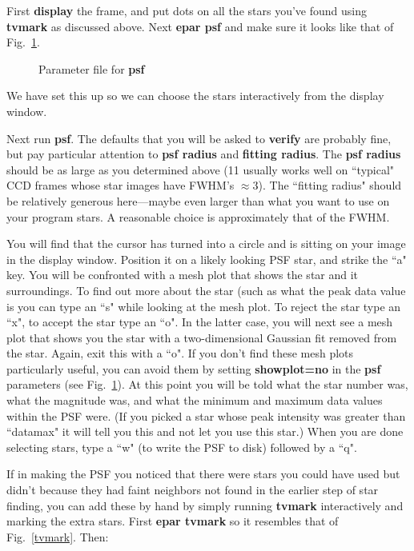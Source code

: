 First {\bf display} the frame, and put dots on all the stars you've found
using {\bf tvmark} as discussed above.  Next {\bf epar psf} and make sure
it looks like that of Fig.~\ref{psfparams}.
\begin{figure}
\vspace{2.5in}
\caption{\label{psfparams} Parameter file for {\bf psf}}
\end{figure}
We have set this up so we can choose the stars interactively from the
display window.
 
Next run {\bf psf}.  The defaults that you will be asked to {\bf verify}
are probably fine, but pay particular attention to {\bf psf radius}
and {\bf fitting radius}.  The {\bf psf radius} should be as large
as you determined above (11 usually works well on ``typical" CCD
frames whose star images have FWHM's $\approx 3$).  The ``fitting radius"
should be relatively generous here---maybe even larger than what you
want to use on your program stars.  A reasonable choice is approximately
that of the FWHM. 
 
You will find that the cursor has turned into a circle and is sitting
on your image in the display window.  Position it on a likely looking
PSF star, and strike the ``a" key. You will be confronted with a mesh
plot that shows the star and it surroundings.  To find out more
about the star (such as what the peak data value is you can type
an ``s" while looking at the mesh plot.  To reject the star type an
``x", to accept the star type an ``o".  In the latter case, you will
next see a mesh plot that
shows you the star with a two-dimensional Gaussian fit removed from the
star.
Again, exit this with a ``o".  If you don't find these mesh
plots particularly useful, you can avoid them by setting {\bf showplot=no}
in the {\bf psf} parameters (see Fig.~\ref{psfparams}).  
At this point you will be told what the star number was, what the
magnitude was, and what the minimum and maximum data values within
the PSF were.   (If you picked a star whose peak intensity was greater
than ``datamax" it will tell you this and not let you use this star.)
When you are done selecting stars, type a ``w" (to write the PSF to
disk) followed by a ``q". 
 
If in making the PSF you noticed that there were stars you could have
used but didn't because they had faint neighbors not found in the earlier
step of star finding, you can add these by hand by simply 
running {\bf tvmark} interactively and marking the extra stars.  First
{\bf epar tvmark} so it resembles that of Fig.~\ref{tvmark}. Then:
 
